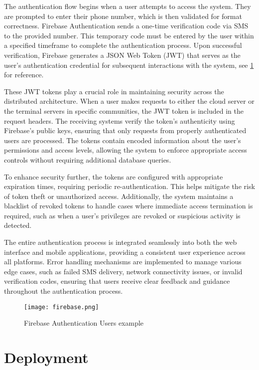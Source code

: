 The authentication flow begins when a user attempts to access the system. They are prompted to enter their phone number, which is then validated for format correctness. Firebase Authentication sends a one-time verification code via SMS to the provided number. This temporary code must be entered by the user within a specified timeframe to complete the authentication process. Upon successful verification, Firebase generates a JSON Web Token (JWT) that serves as the user's authentication credential for subsequent interactions with the system, see \cref{fig:firebase} for reference.

These JWT tokens play a crucial role in maintaining security across the distributed architecture. When a user makes requests to either the cloud server or the terminal servers in specific communities, the JWT token is included in the request headers. The receiving systems verify the token's authenticity using Firebase's public keys, ensuring that only requests from properly authenticated users are processed. The tokens contain encoded information about the user's permissions and access levels, allowing the system to enforce appropriate access controls without requiring additional database queries.

To enhance security further, the tokens are configured with appropriate expiration times, requiring periodic re-authentication. This helps mitigate the risk of token theft or unauthorized access. Additionally, the system maintains a blacklist of revoked tokens to handle cases where immediate access termination is required, such as when a user's privileges are revoked or suspicious activity is detected.

The entire authentication process is integrated seamlessly into both the web interface and mobile applications, providing a consistent user experience across all platforms. Error handling mechanisms are implemented to manage various edge cases, such as failed SMS delivery, network connectivity issues, or invalid verification codes, ensuring that users receive clear feedback and guidance throughout the authentication process.

\begin{figure}
	\texttt{[image: firebase.png]}
	\caption{Firebase Authentication Users example}\label{fig:firebase}
\end{figure}

\section{Deployment}


